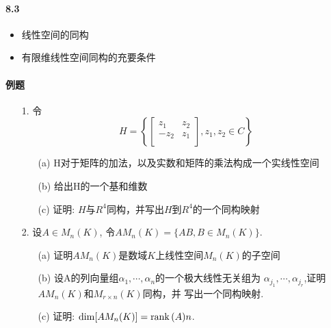 \paragraph{8.3}
\begin{itemize}
    \item 线性空间的同构
    \item 有限维线性空间同构的充要条件
\end{itemize}

\paragraph{例题}
\begin{itemize}
  \item[1.]令
  \begin{equation}
  \nonumber
  H = \left\{
    \begin{bmatrix}
      z_1& z_2\\
     -z_2& z_1\\
    \end{bmatrix},
    z_1, z_2 \in C
      \right\}
  \end{equation}
  \begin{itemize}
    \item[(a)] H对于矩阵的加法，以及实数和矩阵的乘法构成一个实线性空间
    \item[(b)] 给出H的一个基和维数
    \item[(c)] 证明: $H$与$R^4$同构，并写出$H$到$R^4$的一个同构映射  
  \end{itemize}
\end{itemize}
\vspace{1cm}

\begin{itemize}
  \item[2.]设$A \in M_n(K)$, 令$AM_n(K) = \{AB, B\in M_n(K) \}$.
  \begin{itemize}
    \item[(a)] 证明$AM_n(K)$是数域$K$上线性空间$M_n(K)$的子空间
    \item[(b)] 设A的列向量组$\alpha_1, \cdots, \alpha_n$的一个极大线性无关组为
    $\alpha_{j_1}, \cdots, \alpha_{j_r}$,证明$AM_n(K)$和$M_{r\times n}(K)$同构，并
    写出一个同构映射. 
    \item[(c)] 证明: $\dim [AM_n(K)] = \mathrm{rank}\,(A)n$.
  \end{itemize}
\end{itemize}
\vspace{1cm}